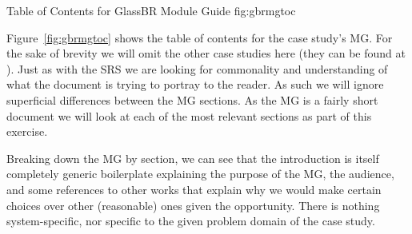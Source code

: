 {Table of Contents for GlassBR Module Guide}
{fig:gbrmgtoc}

Figure~\ref{fig:gbrmgtoc} shows the table of contents for the \gb{} case 
study's MG. For the sake of brevity we will omit the other case studies 
here (they can be found at ). Just as with the SRS we are looking for 
commonality and understanding of what the document is trying to portray to the 
reader. As such we will ignore superficial differences between the MG sections. 
As the MG is a fairly short document we will look at each of the most relevant 
sections as part of this exercise.

Breaking down the MG by section, we can see that the introduction is itself 
completely generic boilerplate explaining the purpose of the MG, the audience, 
and some references to other works that explain why we would make certain 
choices over other (reasonable) ones given the opportunity. There is nothing 
system-specific, nor specific to the given problem domain of the case study.


